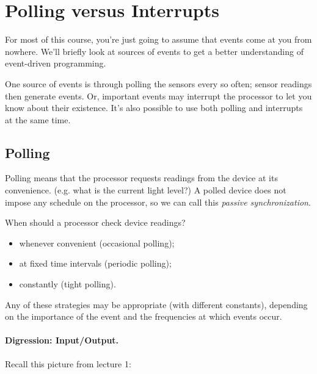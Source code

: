 
\section*{Polling versus Interrupts}
For most of this course, you're just going to assume that events
come at you from nowhere. We'll briefly look at sources
of events to get a better understanding of event-driven
programming.

One source of events is through polling the sensors every so often; 
sensor readings then generate events.  Or, important events may
interrupt the processor to let you know about their existence.
It's also possible to use both polling and interrupts at the same time.

\subsection*{Polling} Polling means that the processor requests readings from
the device at its convenience. (e.g. what is the current light level?)
A polled device does not impose any schedule on the processor, so we
can call this \emph{passive synchronization}.


\noindent
When should a processor check device readings?

\begin{itemize}
\item whenever convenient (occasional polling);
\item at fixed time intervals (periodic polling);
\item constantly (tight polling).
\end{itemize}

Any of these strategies may be appropriate (with different constants),
depending on the importance of the event and the frequencies at which
events occur.

\vspace*{-1em}
\paragraph{Digression: Input/Output.} Recall this picture from lecture 1:

\begin{center}
\end{center}

